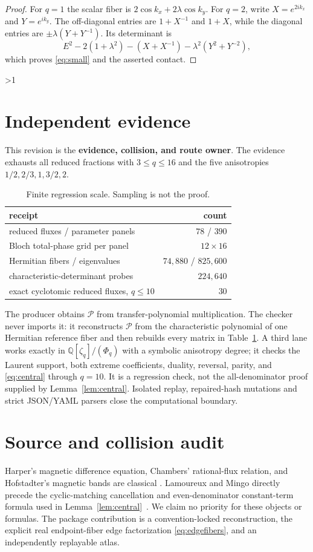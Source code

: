 \documentclass[10pt]{article}
\providecommand{\CRevisionRound}{2}
\newcommand{\PP}{\mathcal P}
\begin{document}
\begin{proof}
For $q=1$ the scalar fiber is
$2\cos k_x+2\lambda\cos k_y$.  For $q=2$, write
$X=e^{2ik_x}$ and $Y=e^{ik_y}$.  The off-diagonal entries are
$1+X^{-1}$ and $1+X$, while the diagonal entries are
$\pm\lambda(Y+Y^{-1})$.  Its determinant is
\[
 E^2-2(1+\lambda^2)-(X+X^{-1})
 -\lambda^2(Y^2+Y^{-2}),
\]
which proves \eqref{eq:small} and the asserted contact.
\end{proof}
\fi

\ifnum\CRevisionRound>1
\section{Independent evidence}
This revision is the \textbf{evidence, collision, and route owner}.
The evidence exhausts all reduced fractions with $3\le q\le16$ and the
five anisotropies $1/2,2/3,1,3/2,2$.
\begin{table}[h]
\centering
\small
\begin{tabular}{@{}lr@{}}
\toprule
receipt & count\\
\midrule
reduced fluxes / parameter panels & $78$ / $390$\\
Bloch total-phase grid per panel & $12\times16$\\
Hermitian fibers / eigenvalues & $74{,}880$ / $825{,}600$\\
characteristic-determinant probes & $224{,}640$\\
exact cyclotomic reduced fluxes, $q\le10$ & $30$\\
\bottomrule
\end{tabular}
\caption{Finite regression scale.  Sampling is not the proof.}
\label{tab:evidence}
\end{table}

The producer obtains $\PP$ from transfer-polynomial multiplication.  The
checker never imports it: it reconstructs $\PP$ from the characteristic
polynomial of one Hermitian reference fiber and then rebuilds every matrix
in Table~\ref{tab:evidence}.  A third lane works exactly in
$\mathbb Q[\zeta_q]/(\Phi_q)$ with a symbolic anisotropy degree; it checks
the Laurent support, both extreme coefficients, duality, reversal, parity,
and \eqref{eq:central} through $q=10$.  It is a regression check, not the
all-denominator proof supplied by Lemma~\ref{lem:central}.  Isolated replay,
repaired-hash mutations and strict JSON/YAML parsers close the computational
boundary.

\section{Source and collision audit}
Harper's magnetic difference equation, Chambers' rational-flux relation,
and Hofstadter's magnetic bands are classical
\cite{Harper,Chambers,Hofstadter,Avron,JKK}.  Lamoureux and Mingo directly
precede the cyclic-matching cancellation and even-denominator constant-term
formula used in Lemma~\ref{lem:central}~\cite{LamoureuxMingo}.  We claim no
priority for these objects or formulas.  The package contribution is a
convention-locked reconstruction, the explicit real endpoint-fiber edge
factorization \eqref{eq:edgefibers}, and an independently replayable atlas.
\end{document}
